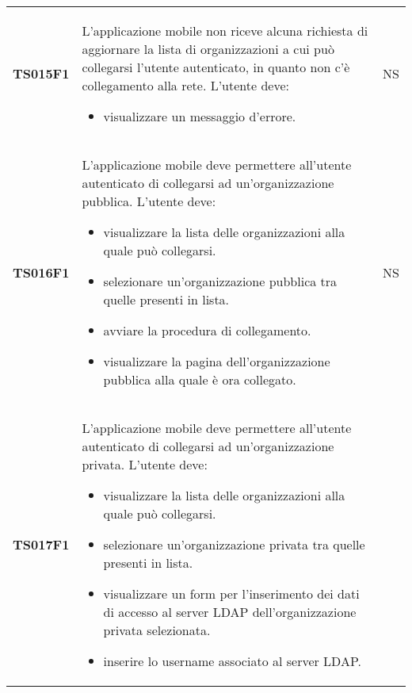 \documentclass[../piano-di-qualifica.tex]{subfiles}
\begin{document}
\begin{centering}
\begin{longtable}[H]{>{\centering\bfseries}m{3cm} >{}p{10cm} >{\centering\arraybackslash}m{3cm}}
    TS015F1            & L'applicazione mobile non riceve alcuna richiesta di aggiornare la lista di organizzazioni a cui può collegarsi l'utente autenticato, in quanto non c'è collegamento alla rete. \newline
    L'utente deve:
    \begin{itemize}
      \item visualizzare un messaggio d'errore.
    \end{itemize}
                       & NS                                                                                                                                                                                                                                                               \\
    TS016F1            & L'applicazione mobile deve permettere all'utente autenticato di collegarsi ad un'organizzazione pubblica. \newline
    L'utente deve:
    \begin{itemize}
      \item visualizzare la lista delle organizzazioni alla quale può collegarsi.
      \item selezionare un'organizzazione pubblica tra quelle presenti in lista.
      \item avviare la procedura di collegamento.
      \item visualizzare la pagina dell'organizzazione pubblica alla quale è ora collegato.
    \end{itemize}
                       & NS                                                                                                                                                                                                                                                               \\
    TS017F1            & L'applicazione mobile deve permettere all'utente autenticato di collegarsi ad un'organizzazione privata. \newline
    L'utente deve:
    \begin{itemize}
      \item visualizzare la lista delle organizzazioni alla quale può collegarsi.
      \item selezionare un'organizzazione privata tra quelle presenti in lista.
      \item visualizzare un form per l'inserimento dei dati di accesso al server LDAP dell'organizzazione privata selezionata.
      \item inserire lo username associato al server LDAP\@.

\end{itemize}
\end{longtable}
\end{centering}
\end{document}
